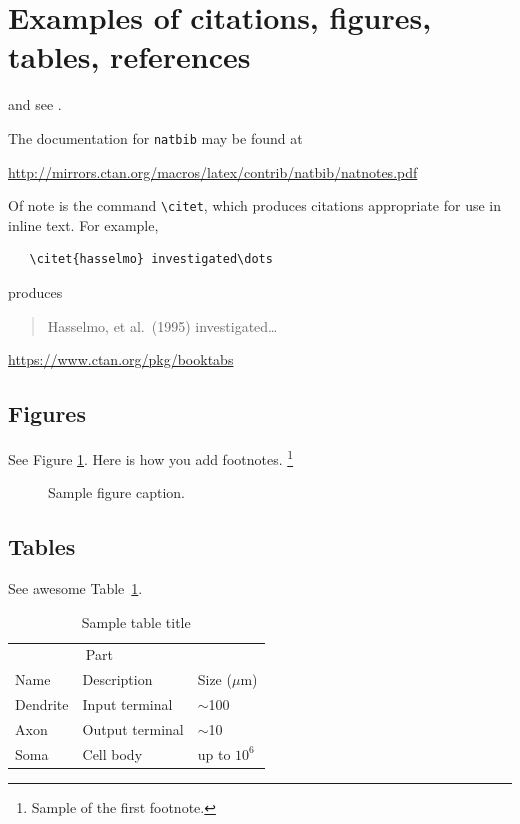 \documentclass{article}
\begin{document}
\section{Examples of citations, figures, tables, references}
\label{sec:others}
\lipsum[8] \cite{kour2014real,kour2014fast} and see \cite{hadash2018estimate}.

The documentation for \verb+natbib+ may be found at
\begin{center}
  \url{http://mirrors.ctan.org/macros/latex/contrib/natbib/natnotes.pdf}
\end{center}
Of note is the command \verb+\citet+, which produces citations
appropriate for use in inline text.  For example,
\begin{verbatim}
   \citet{hasselmo} investigated\dots
\end{verbatim}
produces
\begin{quote}
  Hasselmo, et al.\ (1995) investigated\dots
\end{quote}

\begin{center}
  \url{https://www.ctan.org/pkg/booktabs}
\end{center}


\subsection{Figures}
\lipsum[10] 
See Figure \ref{fig:fig1}. Here is how you add footnotes. \footnote{Sample of the first footnote.}
\lipsum[11] 

\begin{figure}
  \centering
  \fbox{\rule[-.5cm]{4cm}{4cm} \rule[-.5cm]{4cm}{0cm}}
  \caption{Sample figure caption.}
  \label{fig:fig1}
\end{figure}

\subsection{Tables}
\lipsum[12]
See awesome Table~\ref{tab:table}.

\begin{table}
 \caption{Sample table title}
  \centering
  \begin{tabular}{lll}
    \toprule
    \multicolumn{2}{c}{Part}                   \\
    \cmidrule(r){1-2}
    Name     & Description     & Size ($\mu$m) \\
    \midrule
    Dendrite & Input terminal  & $\sim$100     \\
    Axon     & Output terminal & $\sim$10      \\
    Soma     & Cell body       & up to $10^6$  \\
    \bottomrule
  \end{tabular}
  \label{tab:table}
\end{table}
\end{document}
